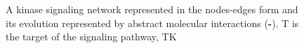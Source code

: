 \documentclass{llncs}
\begin{document}
\begin{figure}[htbp]
\caption{\scriptsize A kinase signaling network represented in the nodes-edges form {\bf\protect{}}
and its evolution represented by abstract molecular interactions
({\bf\protect{}\--{}\protect{}}).
{\sf T} is the target of the signaling pathway, {\sf TK}
}
\end{figure}
\end{document}
